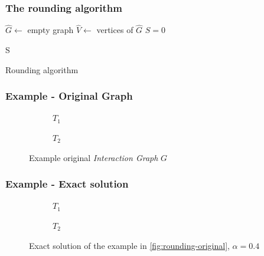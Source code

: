 \documentclass{beamer}
\begin{document}
\begin{frame}[c]
	\frametitle{The rounding algorithm}
	\begin{algorithm}[H]
		\SetAlgoLined
		$\hat{G} \leftarrow $ empty graph \;
		$\hat{V} \leftarrow $ vertices of $\hat{G}$ \;
		$S = 0$


		\Return S \;

		\caption{Rounding algorithm}
		\label{alg:algorithm_rounding}
	\end{algorithm}
\end{frame}

\begin{frame}[c]
	\frametitle{Example - Original Graph}
	\begin{figure}
		\begin{center}
			\begin{subfigure}[b]{0.4\textwidth}
				\centering
				\caption{$T_1$}
				\label{fig:rounding-original-t1}
			\end{subfigure}
			\begin{subfigure}[b]{0.4\textwidth}
				\centering
				\caption{$T_2$}
				\label{fig:rounding-original-t2}
			\end{subfigure}
		\end{center}
		\caption{Example original \emph{Interaction Graph} $G$}
		\label{fig:rounding-original}
	\end{figure}
\end{frame}

\begin{frame}[c]
	\frametitle{Example - Exact solution}
	\begin{figure}
		\begin{center}
			\begin{subfigure}[b]{0.4\textwidth}
				\centering
				\caption{$T_1$}
				\label{fig:rounding-integer-t1}
			\end{subfigure}
			\begin{subfigure}[b]{0.4\textwidth}
				\centering
				\caption{$T_2$}
				\label{fig:rounding-original-t2}
			\end{subfigure}
		\end{center}
		\caption{Exact solution of the example in \autoref{fig:rounding-original},
			$\alpha = 0.4$}
		\label{fig:rounding-integer}
	\end{figure}
\end{frame}
\end{document}
